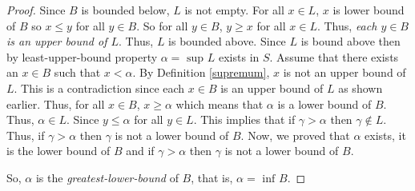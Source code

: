 \begin{proof}
    Since $B$ is bounded below, $L$ is not empty. 
    \bigbreak 
    For all $x \in L$, $x$ is lower bound of $B$ so $x \leq y$ for all $y \in B$.
    So for all $y \in B$, $y \geq x$ for all $x \in L$.
    Thus, {\it each $y \in B$ is an upper bound of $L$}. 
    Thus, $L$ is bounded above.
    \bigbreak
    Since $L$ is bound above then by least-upper-bound property $\alpha = \text{ sup } L$ exists in $S$. 
    \bigbreak
    Assume that there exists an $x \in B$ such that $x < \alpha$.
    By Definition \ref{supremum}, $x$ is not an upper bound of $L$.
    This is a contradiction since each $x \in B$ is an upper bound of $L$ as shown earlier.
    \bigbreak
    Thus, for all $x \in B$, $x \geq \alpha$ which means that $\alpha$ is a lower bound of $B$. Thus, $\alpha \in L$.
    \bigbreak
    Since $y \leq \alpha$ for all $y \in L$. 
    This implies that if $\gamma > \alpha$ then $\gamma \notin L$.
    Thus, if $\gamma > \alpha$ then $\gamma$ is not a lower bound of $B$. 
    \bigbreak
    Now, we proved that $\alpha$ exists, it is the lower bound of $B$ and if $\gamma > \alpha$ 
    then $\gamma$ is not a lower bound of $B$.
     
    So, $\alpha$ is the {\it greatest-lower-bound} of $B$, that is, $\alpha = \text{ inf } B$.
\end{proof}